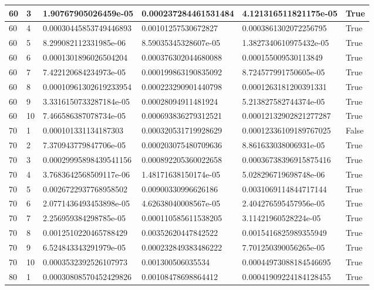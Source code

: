 \documentclass[a4paper, 12pt]{report}
\def\tabsize{4.4cm}
\def\stabsize{0.97cm}
\def\mtabsize{0.73cm}
\begin{document}
\begin{center}
\begin{longtable}{|m{\stabsize}|m{\stabsize}|m{\tabsize}|m{\tabsize}|m{\tabsize}|m{\mtabsize}|}
60 & 3 & 1.90767905026459e-05 & 0.000237284461531484 & 4.121316511821175e-05 & True \\ \hline  
60 & 4 & 0.00030445853749446893 & 0.00101257530672827 & 0.0003861302072256795 & True \\ \hline  
60 & 5 & 8.299082112331985e-06 & 8.59035345328607e-05 & 1.3827340610975432e-05 & True \\ \hline  
60 & 6 & 0.0001301896026504204 & 0.000376302044680088 & 0.000155009530113849 & True \\ \hline  
60 & 7 & 7.422120684234973e-05 & 0.000199863190835092 & 8.724577991750605e-05 & True \\ \hline  
60 & 8 & 0.00010961302619233954 & 0.000223290901440798 & 0.0001263181200391331 & True \\ \hline  
60 & 9 & 3.3316150733287184e-05 & 0.00028094911481924 & 5.213827582744374e-05 & True \\ \hline  
60 & 10 & 7.466586387078734e-05 & 0.000693836279312521 & 0.00012132902821277287 & True \\ \hline  
70 & 1 & 0.000101331134187303 & 0.000320531719928629 & 0.00012336109189767025 & False \\ \hline  
70 & 2 & 7.370943779847706e-05 & 0.000203075480709636 & 8.861633038006931e-05 & True \\ \hline  
70 & 3 & 0.00029995898439541156 & 0.000892205360022658 & 0.00036738396915875416 & True \\ \hline  
70 & 4 & 3.7683642568509117e-06 & 1.48171638150174e-05 & 5.028296719698748e-06 & True \\ \hline  
70 & 5 & 0.0026722937768958502 & 0.00900330996626186 & 0.0031069114844717144 & True \\ \hline  
70 & 6 & 2.0771436493453898e-05 & 4.62638040008567e-05 & 2.404276595457956e-05 & True \\ \hline  
70 & 7 & 2.256959384298785e-05 & 0.000110585611538205 & 3.11421960528224e-05 & True \\ \hline  
70 & 8 & 0.0012510220465788429 & 0.00352620447842522 & 0.0015416825989355949 & True \\ \hline  
70 & 9 & 6.524843343291979e-05 & 0.000232849383486222 & 7.701250390056265e-05 & True \\ \hline  
70 & 10 & 0.0003532392526107973 & 0.001300506035534 & 0.00044973088184546695 & True \\ \hline  
80 & 1 & 0.00030808570452429826 & 0.00108478698864412 & 0.00041909224184128455 & True \\ \hline  

\end{longtable}
\end{center}
\end{document}

